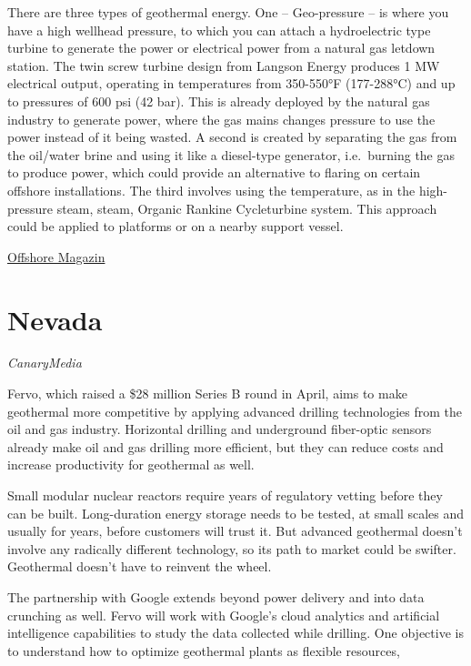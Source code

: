 \documentclass[
]{book}
\begin{document}
There are three types of geothermal energy. One -- Geo-pressure -- is where you have a high wellhead pressure, to which you can attach a hydroelectric type turbine to generate the power or electrical power from a natural gas letdown station. The twin screw turbine design from Langson Energy produces 1 MW electrical output, operating in temperatures from 350-550°F (177-288°C) and up to pressures of 600 psi (42 bar). This is already deployed by the natural gas industry to generate power, where the gas mains changes pressure to use the power instead of it being wasted. A second is created by separating the gas from the oil/water brine and using it like a diesel-type generator, i.e.~burning the gas to produce power, which could provide an alternative to flaring on certain offshore installations. The third involves using the temperature, as in the high-pressure steam, steam, Organic Rankine Cycleturbine system. This approach could be applied to platforms or on a nearby support vessel.

\href{https://www.offshore-mag.com/pipelines/article/16762144/geothermal-power-an-alternate-role-for-redundant-north-sea-platforms}{Offshore Magazin}

\hypertarget{nevada}{%
\section{Nevada}\label{nevada}}

\emph{CanaryMedia}

Fervo, which raised a \$28 million Series B round in April, aims to make geothermal more competitive by applying advanced drilling technologies from the oil and gas industry. Horizontal drilling and underground fiber-optic sensors already make oil and gas drilling more efficient, but they can reduce costs and increase productivity for geothermal as well.

Small modular nuclear reactors require years of regulatory vetting before they can be built. Long-duration energy storage needs to be tested, at small scales and usually for years, before customers will trust it. But advanced geothermal doesn't involve any radically different technology, so its path to market could be swifter.
Geothermal doesn't have to reinvent the wheel.

The partnership with Google extends beyond power delivery and into data crunching as well. Fervo will work with Google's cloud analytics and artificial intelligence capabilities to study the data collected while drilling. One objective is to understand how to optimize geothermal plants as flexible resources,
\end{document}
